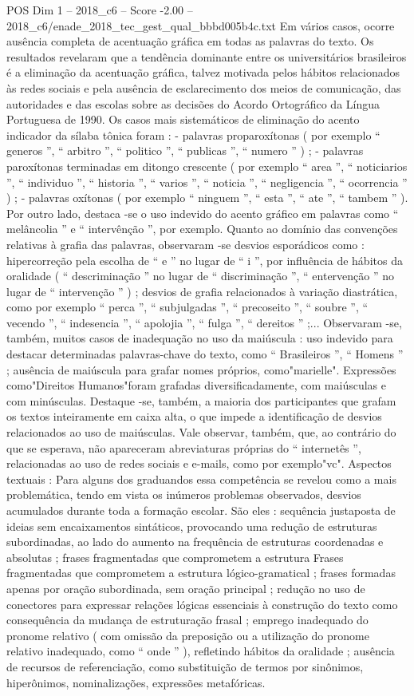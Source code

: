 \begin{textsample}{POS Dim 1 – 2018\_c6 – Score -2.00 – 2018\_c6/enade\_2018\_tec\_gest\_qual\_bbbd005b4c.txt}
Em vários casos, ocorre ausência completa de acentuação gráfica em todas as palavras do texto.
Os resultados revelaram que a tendência dominante entre os universitários brasileiros é a eliminação da acentuação gráfica, talvez motivada pelos hábitos relacionados às redes sociais e pela ausência de esclarecimento dos meios de comunicação, das autoridades e das escolas sobre as decisões do Acordo Ortográfico da Língua Portuguesa de 1990.
Os casos mais sistemáticos de eliminação do acento indicador da sílaba tônica foram : - palavras proparoxítonas ( por exemplo “ generos ”, “ arbitro ”, “ politico ”, “ publicas ”, “ numero ” ) ; - palavras paroxítonas terminadas em ditongo crescente ( por exemplo “ area ”, “ noticiarios ”, “ individuo ”, “ historia ”, “ varios ”, “ noticia ”, “ negligencia ”, “ ocorrencia ” ) ; - palavras oxítonas ( por exemplo “ ninguem ”, “ esta ”, “ ate ”, “ tambem ” ).
Por outro lado, destaca -se o uso indevido do acento gráfico em palavras como “ melâncolia ” e “ intervênção ”, por exemplo.
Quanto ao domínio das convenções relativas à grafia das palavras, observaram -se desvios esporádicos como : hipercorreção pela escolha de “ e ” no lugar de “ i ”, por influência de hábitos da oralidade ( “ descriminação ” no lugar de “ discriminação ”, “ entervenção ” no lugar de “ intervenção ” ) ; desvios de grafia relacionados à variação diastrática, como por exemplo “ perca ”, “ subjulgadas ”, “ precoseito ”, “ soubre ”, “ vecendo ”, “ indesencia ”, “ apolojia ”, “ fulga ”, “ dereitos ” ;...
Observaram -se, também, muitos casos de inadequação no uso da maiúscula : uso indevido para destacar determinadas palavras-chave do texto, como “ Brasileiros ”, “ Homens ” ; ausência de maiúscula para grafar nomes próprios, como"marielle".
Expressões como"Direitos Humanos"foram grafadas diversificadamente, com maiúsculas e com minúsculas.
Destaque -se, também, a maioria dos participantes que grafam os textos inteiramente em caixa alta, o que impede a identificação de desvios relacionados ao uso de maiúsculas.
Vale observar, também, que, ao contrário do que se esperava, não apareceram abreviaturas próprias do “ internetês ”, relacionadas ao uso de redes sociais e e-mails, como por exemplo"vc".
Aspectos textuais : Para alguns dos graduandos essa competência se revelou como a mais problemática, tendo em vista os inúmeros problemas observados, desvios acumulados durante toda a formação escolar.
São eles : sequência justaposta de ideias sem encaixamentos sintáticos, provocando uma redução de estruturas subordinadas, ao lado do aumento na frequência de estruturas coordenadas e absolutas ; frases fragmentadas que comprometem a estrutura Frases fragmentadas que comprometem a estrutura lógico-gramatical ; frases formadas apenas por oração subordinada, sem oração principal ; redução no uso de conectores para expressar relações lógicas essenciais à construção do texto como consequência da mudança de estruturação frasal ; emprego inadequado do pronome relativo ( com omissão da preposição ou a utilização do pronome relativo inadequado, como “ onde ” ), refletindo hábitos da oralidade ; ausência de recursos de referenciação, como substituição de termos por sinônimos, hiperônimos, nominalizações, expressões metafóricas.

\end{textsample}
